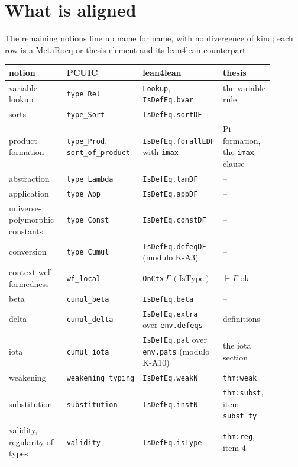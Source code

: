 \section{What is aligned}
\label{sec:ref-aligned}

The remaining notions line up name for name, with no divergence of kind; each row is a MetaRocq
or thesis element and its lean4lean counterpart.

\par\smallskip\noindent
\begin{tabular}{p{0.23\linewidth}p{0.19\linewidth}p{0.27\linewidth}p{0.20\linewidth}}
\toprule
notion & PCUIC & lean4lean & thesis \\
\midrule
variable lookup & \texttt{type\_Rel} & \texttt{Lookup}, \texttt{IsDefEq.bvar} & the variable rule
\\
sorts & \texttt{type\_Sort} & \texttt{IsDefEq.sortDF} & -- \\
product formation & \texttt{type\_Prod}, \texttt{sort\_of\_product} & \texttt{IsDefEq.forallEDF}
with \texttt{imax} & Pi-formation, the \texttt{imax} clause \\
abstraction & \texttt{type\_Lambda} & \texttt{IsDefEq.lamDF} & -- \\
application & \texttt{type\_App} & \texttt{IsDefEq.appDF} & -- \\
universe-polymorphic constants & \texttt{type\_Const} & \texttt{IsDefEq.constDF} & -- \\
conversion & \texttt{type\_Cumul} & \texttt{IsDefEq.defeqDF} (modulo K-A3) & -- \\
context well-formedness & \texttt{wf\_local} & \texttt{OnCtx}\,$\Gamma\,(\mathrm{IsType})$ &
$\vdash \Gamma$ ok \\
beta & \texttt{cumul\_beta} & \texttt{IsDefEq.beta} & -- \\
delta & \texttt{cumul\_delta} & \texttt{IsDefEq.extra} over \texttt{env.defeqs} & definitions \\
iota & \texttt{cumul\_iota} & \texttt{IsDefEq.pat} over \texttt{env.pats} (modulo K-A10) & the
iota section \\
weakening & \texttt{weakening\_typing} & \texttt{IsDefEq.weakN} & \texttt{thm:weak} \\
substitution & \texttt{substitution} & \texttt{IsDefEq.instN} & \texttt{thm:subst}, item
\texttt{subst\_ty} \\
validity, regularity of types & \texttt{validity} & \texttt{IsDefEq.isType} & \texttt{thm:reg},
item 4 \\

\end{tabular}
